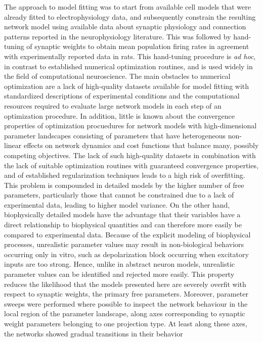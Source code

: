 %
%
%
%
%
%
%
The approach to model fitting was to start from available cell models that
were already fitted to electrophysiology data, and subsequently constrain the resulting
network model using available data about synaptic physiology and connection patterns
reported in the neurophysiology literature. This was followed by hand-tuning
of synaptic weights to obtain mean population firing rates in agreement with experimentally
reported data in rats.
This hand-tuning procedure is \textit{ad hoc}, in contrast to established numerical
optimization routines, and is used widely in the field of computational neuroscience.
The main obstacles to numerical optimization are a lack of high-quality datasets
available for model fitting with standardized descriptions of experimental conditions
and the computational resources required to evaluate large network models in each
step of an optimization procedure. In addition, little is known about the convergence
properties of optimization procuedures for network models with high-dimensional
parameter landscapes consisting of parameters that have heterogeneous non-linear
effects on network dynamics and cost functions that balance many, possibly competing objectives.
%
%
The lack of such high-quality datasets in combination with the lack of suitable
optimization routines with guaranteed convergence properties, and of established
regularization techniques leads to a high risk of overfitting. This problem is
compounded in detailed models by the higher number of free parameters, particularly
those that cannot be constrained due to a lack of experimental data, leading
to higher model variance.
%
%
%
On the other hand, biophysically detailed models have the
advantage that their variables have a direct relationship to biophysical
quantities and can therefore more easily be compared to experimental data.
Because of the explicit modeling of biophysical processes, unrealistic parameter
values may result in non-biological behaviors occurring only in vitro, such as depolarization
block occurring when excitatory inputs are too strong. Hence, unlike in abstract
neuron models, unrealistic parameter values can be identified and rejected more
easily.
%
This property reduces the likelihood that the models presented here
are severely overfit with respect to synaptic weights, the primary free parameters.
Moreover, parameter sweeps were performed where possible to inspect the network
behaviour in the local region of the parameter landscape, along axes corresponding
to synaptic weight parameters belonging to one projection type. At least
along these axes, the networks showed gradual transitions in their behavior
